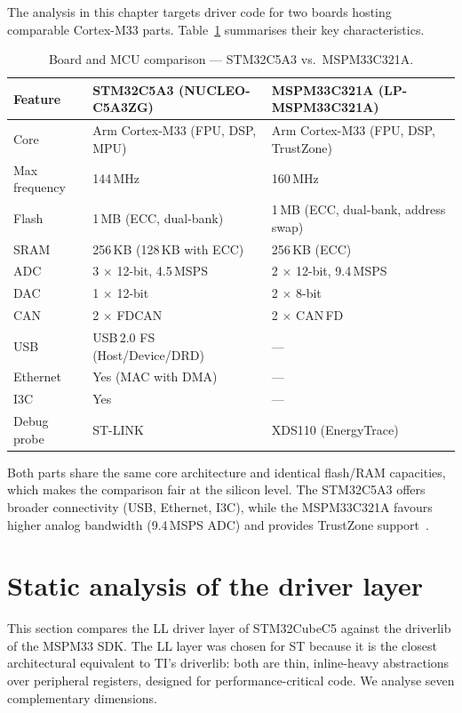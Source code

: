 The analysis in this chapter targets driver code for two boards hosting comparable
Cortex-M33 parts. Table~\ref{tab:ti-board-comparison} summarises their key characteristics.

\begin{table}[H]
\centering
\caption{Board and MCU comparison --- STM32C5A3 vs.\ MSPM33C321A.}
\label{tab:ti-board-comparison}
\begin{tabular}{l l l}
\toprule
\textbf{Feature} & \textbf{STM32C5A3 (NUCLEO-C5A3ZG)} & \textbf{MSPM33C321A (LP-MSPM33C321A)} \\
\midrule
Core & Arm Cortex-M33 (FPU, DSP, MPU) & Arm Cortex-M33 (FPU, DSP, TrustZone) \\
Max frequency & 144\,MHz & 160\,MHz \\
Flash & 1\,MB (ECC, dual-bank) & 1\,MB (ECC, dual-bank, address swap) \\
SRAM & 256\,KB (128\,KB with ECC) & 256\,KB (ECC) \\
ADC & 3 $\times$ 12-bit, 4.5\,MSPS & 2 $\times$ 12-bit, 9.4\,MSPS \\
DAC & 1 $\times$ 12-bit & 2 $\times$ 8-bit \\
CAN & 2 $\times$ FDCAN & 2 $\times$ CAN\,FD \\
USB & USB\,2.0 FS (Host/Device/DRD) & --- \\
Ethernet & Yes (MAC with DMA) & --- \\
I3C & Yes & --- \\
Debug probe & ST-LINK & XDS110 (EnergyTrace) \\
\bottomrule
\end{tabular}
\end{table}

Both parts share the same core architecture and identical flash/RAM capacities, which makes
the comparison fair at the silicon level. The STM32C5A3 offers broader connectivity (USB,
Ethernet, I3C), while the MSPM33C321A favours higher analog bandwidth (9.4\,MSPS ADC) and
provides TrustZone support~\cite{ti-mspm33-ds,stm32c5a3-product}.

\section{Static analysis of the driver layer}
\label{sec:ti-static-analysis}

This section compares the LL driver layer of STM32CubeC5 against the driverlib of the
MSPM33 SDK. The LL layer was chosen for ST because it is the closest architectural
equivalent to TI's driverlib: both are thin, inline-heavy abstractions over peripheral
registers, designed for performance-critical code. We analyse seven complementary
dimensions.

